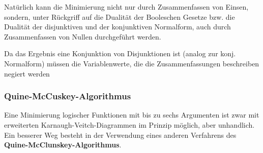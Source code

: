 \documentclass[12pt]{report}
\begin{document}
\begin{infobox}
  Natürlich kann die Minimierung nicht nur durch Zusammenfassen von Einsen, sondern, 
  unter Rückgriff auf die Dualität der Booleschen Gesetze bzw. 
  die Dualität der disjunktiven und der konjunktiven Normalform, 
  auch durch Zusammenfassen von Nullen durchgeführt werden.

  Da das Ergebnis eine Konjunktion von Disjunktionen ist (analog zur konj. Normalform) 
  müssen die Variablenwerte, 
  die die Zusammenfassungen beschreiben negiert werden
\end{infobox}
\subsubsection{Quine-McCuskey-Algorithmus}
Eine Minimierung logischer Funktionen mit bis zu sechs Argumenten ist zwar mit erweiterten 
Karnaugh-Veitch-Diagrammen im Prinzip möglich, aber unhandlich. Ein besserer Weg besteht 
in der Verwendung eines anderen Verfahrens des \textbf{Quine-McClunskey-Algorithmus}.
\end{document}
